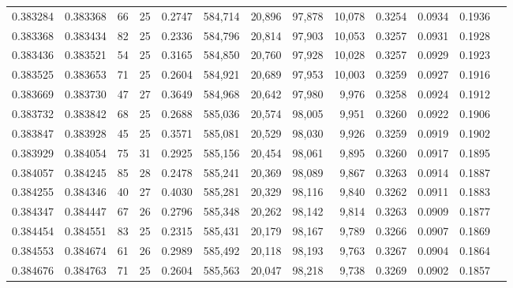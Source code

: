 \begin{tabular}{rrrrrrrrrrrrr}
0.383284 & 0.383368 &    66 &  25 &                                     0.2747 & 584,714 &  20,896 &  97,878 &  10,078 & 0.3254 & 0.0934 & 0.1936 \\
0.383368 & 0.383434 &    82 &  25 &                                     0.2336 & 584,796 &  20,814 &  97,903 &  10,053 & 0.3257 & 0.0931 & 0.1928 \\
0.383436 & 0.383521 &    54 &  25 &                                     0.3165 & 584,850 &  20,760 &  97,928 &  10,028 & 0.3257 & 0.0929 & 0.1923 \\
0.383525 & 0.383653 &    71 &  25 &                                     0.2604 & 584,921 &  20,689 &  97,953 &  10,003 & 0.3259 & 0.0927 & 0.1916 \\
0.383669 & 0.383730 &    47 &  27 &                                     0.3649 & 584,968 &  20,642 &  97,980 &   9,976 & 0.3258 & 0.0924 & 0.1912 \\
0.383732 & 0.383842 &    68 &  25 &                                     0.2688 & 585,036 &  20,574 &  98,005 &   9,951 & 0.3260 & 0.0922 & 0.1906 \\
0.383847 & 0.383928 &    45 &  25 &                                     0.3571 & 585,081 &  20,529 &  98,030 &   9,926 & 0.3259 & 0.0919 & 0.1902 \\
0.383929 & 0.384054 &    75 &  31 &                                     0.2925 & 585,156 &  20,454 &  98,061 &   9,895 & 0.3260 & 0.0917 & 0.1895 \\
0.384057 & 0.384245 &    85 &  28 &                                     0.2478 & 585,241 &  20,369 &  98,089 &   9,867 & 0.3263 & 0.0914 & 0.1887 \\
0.384255 & 0.384346 &    40 &  27 &                                     0.4030 & 585,281 &  20,329 &  98,116 &   9,840 & 0.3262 & 0.0911 & 0.1883 \\
0.384347 & 0.384447 &    67 &  26 &                                     0.2796 & 585,348 &  20,262 &  98,142 &   9,814 & 0.3263 & 0.0909 & 0.1877 \\
0.384454 & 0.384551 &    83 &  25 &                                     0.2315 & 585,431 &  20,179 &  98,167 &   9,789 & 0.3266 & 0.0907 & 0.1869 \\
0.384553 & 0.384674 &    61 &  26 &                                     0.2989 & 585,492 &  20,118 &  98,193 &   9,763 & 0.3267 & 0.0904 & 0.1864 \\
0.384676 & 0.384763 &    71 &  25 &                                     0.2604 & 585,563 &  20,047 &  98,218 &   9,738 & 0.3269 & 0.0902 & 0.1857 \\

\end{tabular}
